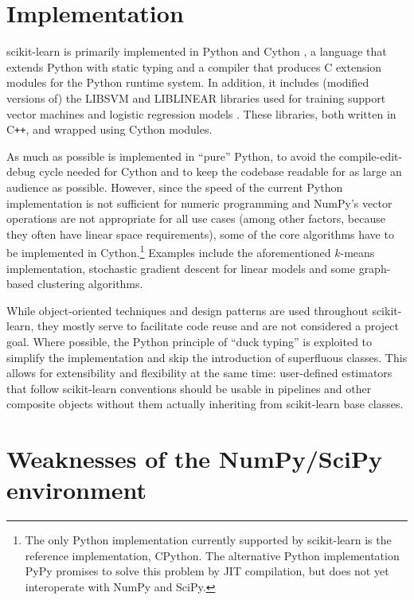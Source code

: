 \documentclass[a4paper]{article}
\begin{document}
\section{Implementation}

scikit-learn is primarily implemented in Python and Cython
\citep{behnel2011cython},
a language that extends Python with static typing
and a compiler that produces C extension modules
for the Python runtime system.
In addition, it includes (modified versions of)
the \textsf{LIBSVM} and \textsf{LIBLINEAR} libraries
used for training support vector machines
and logistic regression models \citep{chang2011libsvm, fan2008}.
These libraries, both written in C{}\verb!++!,
and wrapped using Cython modules.

As much as possible is implemented in ``pure'' Python,
to avoid the compile-edit-debug cycle needed for Cython
and to keep the codebase readable for as large an audience as possible.
However, since the speed of the current Python implementation
is not sufficient for numeric programming
and NumPy's vector operations are not appropriate for all use cases
(among other factors, because they often have linear space requirements),
some of the core algorithms have to be implemented in Cython.\footnote{
  The only Python implementation currently supported by scikit-learn
  is the reference implementation, CPython.
  The alternative Python implementation PyPy \citep{bolz2009tracing}
  promises to solve this problem by JIT compilation,
  but does not yet interoperate with NumPy and SciPy.
}
Examples include the aforementioned $k$-means implementation,
stochastic gradient descent for linear models
and some graph-based clustering algorithms.

While object-oriented techniques and design patterns
are used throughout scikit-learn,
they mostly serve to facilitate code reuse and are not considered a project goal.
Where possible, the Python principle of ``duck typing'' is exploited
to simplify the implementation and skip the introduction of superfluous classes.
This allows for extensibility and flexibility at the same time:
user-defined estimators that follow scikit-learn conventions
should be usable in pipelines and other composite objects
without them actually inheriting from scikit-learn base classes.

\section{Weaknesses of the NumPy/SciPy environment}
\end{document}

